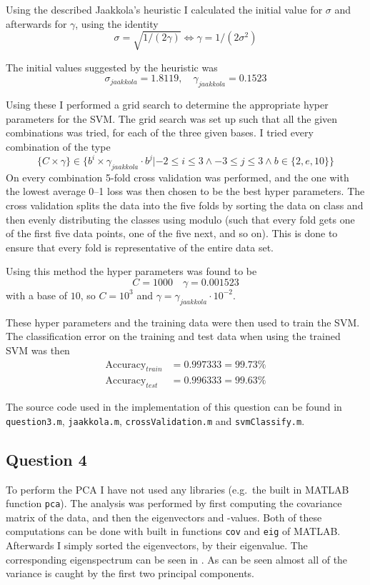 \documentclass[a4paper, 11pt]{article}
\begin{document}
Using the described Jaakkola's heuristic I calculated the initial value for $\sigma$ and afterwards for $\gamma$, using the identity
\[
    \sigma = \sqrt{1 / (2 \gamma)} \Leftrightarrow \gamma = 1 / (2 \sigma^2)
\]

The initial values suggested by the heuristic was
\[
    \sigma_{\mathit{jaakkola}} = 1.8119,\quad \gamma_{\mathit{jaakkola}} = 0.1523
\]

Using these I performed a grid search to determine the appropriate hyper parameters for the SVM\@. The grid search was set up such that all the given combinations was tried, for each of the three given bases. I tried every combination of the type
\[
    \lbrace C \times \gamma \rbrace \in \lbrace b^i \times \gamma_{\mathit{jaakkola}} \cdot b^j | -2 \le i \le 3 \wedge -3 \le j \le 3 \wedge b \in \lbrace 2, e, 10 \rbrace \rbrace
\]
On every combination 5-fold cross validation was performed, and the one with the lowest average 0--1 loss was then chosen to be the best hyper parameters. The cross validation splits the data into the five folds by sorting the data on class and then evenly distributing the classes using modulo (such that every fold gets one of the first five data points, one of the five next, and so on). This is done to ensure that every fold is representative of the entire data set.

Using this method the hyper parameters was found to be
\[
    C = 1000 \quad \gamma = 0.001523
\]
with a base of $10$, so $C = 10^3$ and $\gamma = \gamma_{\mathit{jaakkola}} \cdot 10^{-2}$.

These hyper parameters and the training data were then used to train the SVM\@. The classification error on the training and test data when using the trained SVM was then
\begin{align*}
    \mathrm{Accuracy}_{\mathit{train}} &= 0.997333 = 99.73 \% \\
    \mathrm{Accuracy}_{\mathit{test}} &= 0.996333 = 99.63 \%
\end{align*}

The source code used in the implementation of this question can be found in \texttt{question3.m}, \texttt{jaakkola.m}, \texttt{crossValidation.m} and \texttt{svmClassify.m}.

\subsection*{Question 4}
To perform the PCA I have not used any libraries (e.g.\ the built in MATLAB function \texttt{pca}). The analysis was performed by first computing the covariance matrix of the data, and then the eigenvectors and -values. Both of these computations can be done with built in functions \texttt{cov} and \texttt{eig} of MATLAB\@. Afterwards I simply sorted the eigenvectors, by their eigenvalue. The corresponding eigenspectrum can be seen in . As can be seen almost all of the variance is caught by the first two principal components. 
\end{document}
